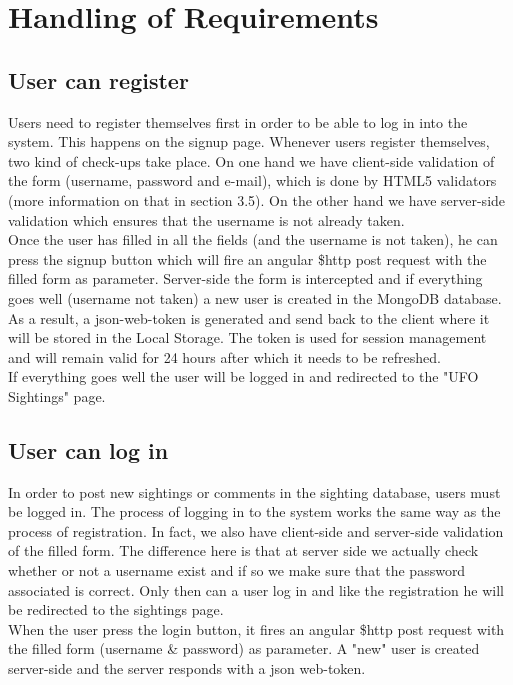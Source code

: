 \documentclass{article}
\begin{document}
\section{Handling of Requirements}
\subsection{User can register}
Users need to register themselves first in order to be able to log in into the system. This happens on the signup page. Whenever users register themselves, two kind of check-ups take place. On one hand we have client-side validation of the form (username, password and e-mail), which is done by HTML5 validators (more information on that in section 3.5). On the other hand we have server-side validation which ensures that the username is not already taken. \\

Once the user has filled in all the fields (and the username is not taken), he can press the signup button which will fire an angular \$http post request with the filled form as parameter.
Server-side the form is intercepted and if everything goes well (username not taken) a new user is created in the MongoDB database. As a result, a json-web-token is generated and send back to the client where it will be stored in the Local Storage. The token is used for session management and will remain valid for 24 hours after which it needs to be refreshed. \\

If everything goes well the user will be logged in and redirected to the "UFO Sightings" page.

\subsection{User can log in}
In order to post new sightings  or comments in the sighting database, users must be logged in. The process of logging in to the system works the same way as the process of registration. In fact, we also have client-side and server-side validation of the filled form. The difference here is that at server side we actually check whether or not a username exist and if so we make sure that the password associated is correct. Only then can a user log in and like the registration he will be redirected to the sightings page. \\

When the user press the login button, it fires an angular \$http post request with the filled form (username \& password) as parameter. A "new" user is created server-side and the server responds with a json web-token. \\
\end{document}
